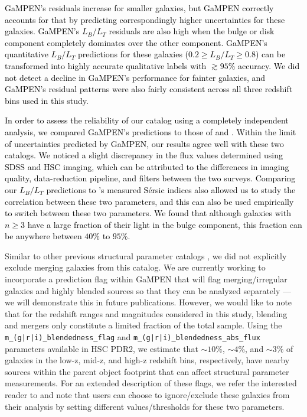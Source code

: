 \documentclass[linenumbers,twocolumn,twocolappendix]{aastex631}
\newcommand\sersic{S\'ersic}
\newcommand\gampen{GaMPEN}
\begin{document}
\begin{CJK*}{UTF8}{gbsn}
\textcolor{black}{\gampen{}'s residuals increase for smaller galaxies, but \gampen{} correctly accounts for that by predicting correspondingly higher uncertainties for these galaxies. \gampen{}'s $L_B/L_T$ residuals are also high when the bulge or disk component completely dominates over the other component. \gampen{}'s quantitative $L_B/L_T$ predictions for these galaxies ($0.2 \geq L_B/L_T \geq 0.8$) can be transformed into highly accurate qualitative labels with $\gtrsim95\%$ accuracy. We did not detect a decline in \gampen{}'s performance for fainter galaxies, and \gampen{}'s residual patterns were also fairly consistent across all three redshift bins used in this study.}

\textcolor{black}{In order to assess the reliability of our catalog using a completely independent analysis, we compared \gampen{}'s predictions to those of \citet{simard_11} and \citet{hsc_sersic}. Within the limit of uncertainties predicted by \gampen{}, our results agree well with these two catalogs. We noticed a slight discrepancy in the flux values determined using SDSS and HSC imaging, which can be attributed to the differences in imaging quality, data-reduction pipeline, and filters between the two surveys. Comparing our $L_B/L_T$ predictions to \citet{hsc_sersic}'s measured \sersic{} indices also allowed us to study the correlation between these two parameters, and this can also be used empirically to switch between these two parameters. We found that although galaxies with $n\geq3$ have a large fraction of their light in the bulge component, this fraction can be anywhere between $40\%$ to $95\%$.}

Similar to other previous structural parameter catalogs \citep[e.g.,][]{simard_11,tarsitano_18}, we did not explicitly exclude merging galaxies from this catalog. We are currently working to incorporate a prediction flag within \gampen{} that will flag merging/irregular galaxies and highly blended sources so that they can be analyzed separately --- we will demonstrate this in future publications. However, we would like to note that for the redshift ranges and magnitudes considered in this study, blending and mergers only constitute a limited fraction of the total sample. Using the \texttt{m\_(g|r|i)\_blendedness\_flag} and \texttt{m\_(g|r|i)\_blendedness\_abs\_flux} parameters available in HSC PDR2, we estimate that $\sim10\%$, $\sim4\%$, and $\sim3\%$ of galaxies in the low-z, mid-z, and high-z redshift bins, respectively, have nearby sources within the parent object footprint that can affect structural parameter measurements. For an extended description of these flags, we refer the interested reader to \citet{hsc_pipeline} and note that users can choose to ignore/exclude these galaxies from their analysis by setting different values/thresholds for these two parameters. 


\end{CJK*}
\end{document}
